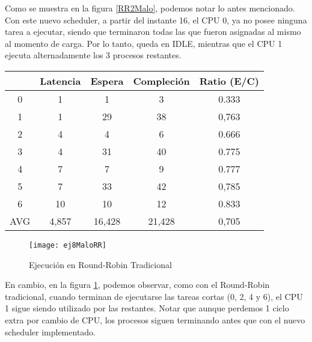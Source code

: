 Como se muestra en la figura \ref{RR2Malo}, podemos notar lo antes mencionado. Con este nuevo scheduler, a partir del instante 16, el CPU 0, ya no posee ninguna tarea a ejecutar, siendo que terminaron todas las que fueron asignadas al mismo al momento de carga. Por lo tanto, queda en IDLE, mientras que el CPU 1 ejecuta alternadamente los 3 procesos restantes.

\begin{table}[h]
  \begin{center}
    \begin{tabular}{c c c c c}
    \hline
          & Latencia & Espera & Compleción & Ratio (E/C) \\
    \hline
        0 &     1    &    1   &      3     &     0.333   \\
        1 &     1    &   29   &     38     &     0,763   \\
        2 &     4    &    4   &      6     &     0.666   \\
        3 &     4    &   31   &     40     &     0.775   \\
        4 &     7    &    7   &      9     &     0.777   \\
        5 &     7    &   33   &     42     &     0,785   \\
        6 &     10   &   10   &     12     &     0.833   \\
        AVG & 4,857  & 16,428 &   21,428   &     0,705   \\
    \end{tabular}
  \end{center}
\end{table}

\begin{figure}[h]
    \texttt{[image: ej8MaloRR]}
    \caption{Ejecución en Round-Robin Tradicional}
    \label{RRMalo}
\end{figure}

En cambio, en la figura \ref{RRMalo}, podemos observar, como con el Round-Robin tradicional, cuando terminan de ejecutarse las tareas cortas (0, 2, 4 y 6), el CPU 1 sigue siendo utilizado por las restantes. Notar que aunque perdemos 1 ciclo extra por cambio de CPU, los procesos siguen terminando antes que con el nuevo scheduler implementado.

